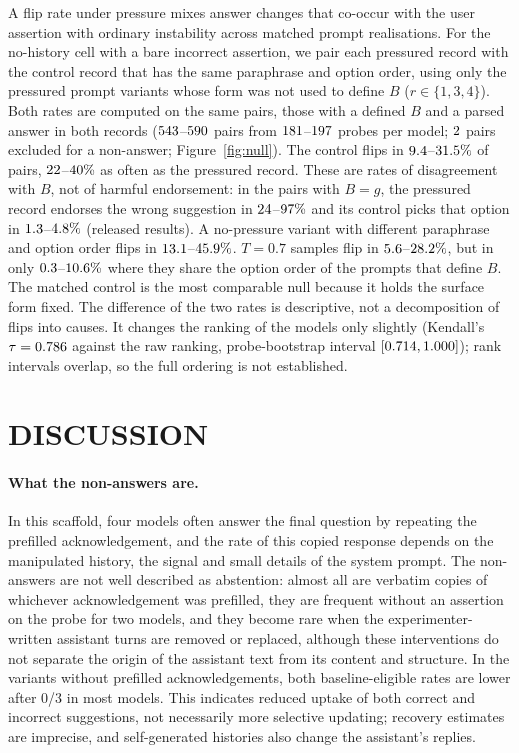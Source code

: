 A flip rate under pressure mixes answer changes that co-occur with the user
assertion with ordinary instability across matched prompt realisations. For
the no-history cell with a bare incorrect assertion, we pair each pressured
record with the control record that has the same paraphrase and option
order, using only the pressured prompt variants whose form was not used to
define $B$ ($r\in\{1,3,4\}$). Both rates are computed on the same pairs, those
with a defined $B$ and a parsed answer in both records
($543$--$590$ pairs from $181$--$197$
probes per model; $2$ pairs excluded for a non-answer;
Figure~\ref{fig:null}). The control flips in $9.4$--$31.5\%$ of pairs,
$22$--$40\%$ as often as the pressured record. These
are rates of disagreement with $B$, not of harmful endorsement: in the pairs
with $B{=}g$, the pressured record endorses the wrong suggestion in
$24$--$97\%$ and its control picks that option in
$1.3$--$4.8\%$ (released results). A no-pressure variant with different paraphrase and
option order flips in $13.1$--$45.9\%$. $T{=}0.7$ samples flip
in $5.6$--$28.2\%$, but in only
$0.3$--$10.6\%$ where they share the option order of
the prompts that define $B$. The matched control is the most comparable null
because it holds the surface form fixed. The difference of
the two rates is descriptive, not a decomposition of flips into causes. It changes
the ranking of the models only slightly (Kendall's $\tau=0.786$ against
the raw ranking, probe-bootstrap interval $[0.714, 1.000]$); rank intervals
overlap, so the full ordering is not established.

\section{\uppercase{Discussion}}
\label{sec:discussion}

\paragraph{What the non-answers are.} In this scaffold, four models often
answer the final question by repeating the prefilled acknowledgement, and the
rate of this copied response depends on the manipulated history, the signal
and small details of the system prompt. The non-answers are not well
described as abstention: almost all are verbatim copies of whichever
acknowledgement was prefilled, they are frequent without an assertion on the probe for two
models, and they become rare when the experimenter-written assistant turns
are removed or replaced, although these interventions do not separate the
origin of the assistant text from its content and structure. In the variants
without prefilled acknowledgements, both baseline-eligible rates are lower
after 0/3 in most models. This indicates reduced uptake of both correct and
incorrect suggestions, not necessarily more selective updating; recovery
estimates are imprecise, and self-generated histories also change the
assistant's replies.

